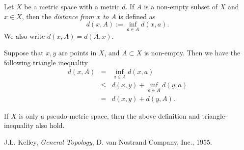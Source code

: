 \documentclass[12pt]{article}
\begin{document}
Let $X$ be a metric space with a metric $d$. If $A$ is a non-empty
subset of $X$ and $x\in X$, then the \emph{distance from $x$ to $A$}
\cite{kelley} is defined as
$$ d(x,A) := \inf_{a\in A} d(x,a).$$
We also write $d(x,A)=d(A,x)$.

Suppose that $x,y$ are points in $X$, and $A\subset X$ is non-empty.
Then we have the following triangle inequality
\begin{eqnarray*}
d(x,A) &=& \inf_{a\in A} d(x,a) \\
        &\le& d(x,y) + \inf_{a\in A} d(y,a) \\
        &=& d(x,y) + d(y,A).
\end{eqnarray*}

If $X$ is only a pseudo-metric space, then the above definition
and triangle-inequality also hold.

\begin{thebibliography}{9}
 J.L. Kelley,
 \emph{General Topology},
 D. van Nostrand Company, Inc., 1955.
 \end{thebibliography}
\end{document}
